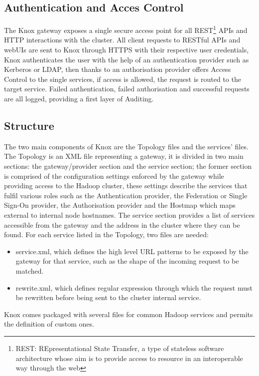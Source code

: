 \subsection{Authentication and Acces Control}
The Knox gateway exposes a single secure access point for all REST\footnote{REST: REpresentational State Transfer, a type of stateless software architecture whose aim is to provide access to resource in an interoperable way through the web} APIs and HTTP interactions with the cluster.\newline
All client requests to RESTful APIs and webUIs are sent to Knox through HTTPS with their respective user credentials, Knox authenticates the user with the help of an authentication provider such as Kerberos or LDAP, then thanks to an authorisation provider offers Access Control to the single services, if access is allowed, the request is routed to the target service.
Failed authentication, failed authorisation and successful requests are all logged, providing a first layer of Auditing.
\pagebreak

\subsection{Structure}
The two main components of Knox are the Topology files and the services' files.
\newline
The Topology is an XML file representing a gateway, it is divided in two main sections: the gateway/provider section and the service section; the former section is comprised of the configuration settings enforced by the gateway while providing access to the Hadoop cluster, these settings describe the services that fulfil various roles such as the Authentication provider, the Federation or Single Sign-On provider, the Authorisation provider and the Hostmap which maps external to internal node hostnames.
The service section provides a list of services accessible from the gateway and the address in the cluster where they can be found.
\newline
For each service listed in the Topology, two files are needed: 
\begin{itemize}
	\item service.xml, which defines the high level URL patterns to be exposed by the gateway for that service, such as the shape of the incoming request to be matched.
	\item rewrite.xml, which defines regular expression through which the request must be rewritten before being sent to the cluster internal service.
\end{itemize}
Knox comes packaged with several files for common Hadoop services and permits the definition of custom ones. 

